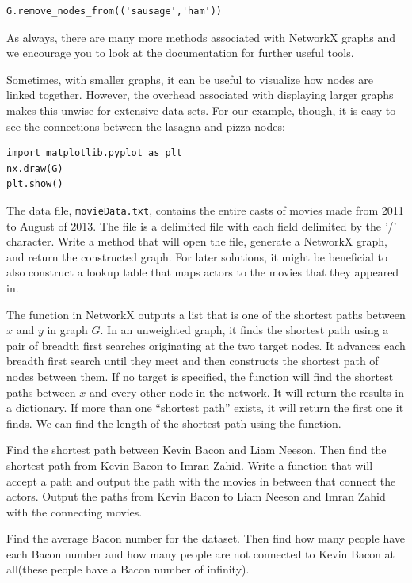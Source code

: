 \begin{lstlisting}
G.remove_nodes_from(('sausage','ham'))
\end{lstlisting} 
As always, there are many more methods associated with NetworkX graphs and we encourage you to look at the documentation for further useful tools.

Sometimes, with smaller graphs, it can be useful to visualize how nodes are linked together. However, the overhead associated with displaying larger graphs makes this unwise for extensive data sets. For our example, though, it is easy to see the connections between the lasagna and pizza nodes:

\begin{lstlisting}
import matplotlib.pyplot as plt
nx.draw(G)
plt.show()
\end{lstlisting}


\begin{problem}
The data file, \texttt{movieData.txt}, contains the entire casts of movies made from 2011 to August of 2013. The file is a delimited file with each field delimited by the '/' character.
Write a method that will open the file, generate a NetworkX graph, and return the constructed graph.
For later solutions, it might be beneficial to also construct a lookup table that maps actors to the movies that they appeared in.
\end{problem}

The  function in NetworkX outputs a list that is one of the shortest paths between $x$ and $y$ in graph $G$.  In an unweighted graph, it finds the shortest path using a pair of breadth first searches originating at the two target nodes.  It advances each breadth first search until they meet and then  constructs the shortest path of nodes between them.  If no target is specified, the function will find the shortest paths between $x$ and every other node in the network.  It will return the results in a dictionary.  If more than one ``shortest path'' exists, it will return the first one it finds.  We can find the length of the shortest path using the  function.

\begin{problem}
Find the shortest path between Kevin Bacon and Liam Neeson. Then find the shortest path from Kevin Bacon to Imran Zahid. Write a function that will accept a path and output the path with the movies in between that connect the actors. Output the paths from Kevin Bacon to Liam Neeson and Imran Zahid with the connecting movies.
\end{problem}

\begin{problem}
Find the average Bacon number for the dataset. Then find how many people have each Bacon number and how many people are not connected to Kevin Bacon at all(these people have a Bacon number of infinity).
\end{problem}

